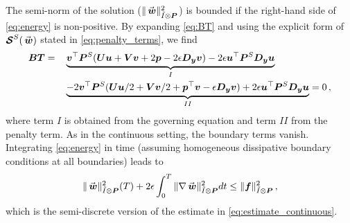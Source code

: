 The semi-norm of the solution ($\|\wn\|^2_{\It\otimes \Pn}$)  is bounded if the right-hand side of \eqref{eq:energy} is non-positive. By expanding \eqref{eq:BT} and using the explicit form of $\satn^S(\wn)$ stated in \eqref{eq:penalty_terms}, we find
\begin{equation*}
\begin{aligned}
 \bm{BT} & = && 
 \underbrace{
 \bm{v}^\top \bm{P}^S(\bm{U}\bm{u} + \bm{V} \bm{v} + 2\bm{p} - 2 \epsilon  \bm{D_y} \bm{v} ) -2 \epsilon\bm{u}^\top \bm{P}^S\bm{D_y}\bm{u}}_I
  \\
  &&&
  \underbrace{
  - 2\bm{v}^\top \bm{P}^S(\bm{U} \bm{u}/2 + \bm{V} \bm{v}/2 + \bm{p}^\top \bm{v} - \epsilon \bm{D_y} \bm{v}) 
  + 2\epsilon \bm{u}^\top \bm{P}^S \bm{D_y} \bm{u}}_{II}
  = 0
  \, ,
\end{aligned}
\end{equation*}
where term $I$ is obtained from the governing equation and term $II$ from the penalty term.
As in the continuous setting, the boundary terms vanish.
Integrating \eqref{eq:energy} in time (assuming homogeneous dissipative boundary conditions at all boundaries) leads to
\begin{equation*}
  \|\wn\|^2_{\It\otimes \Pn} (T)
  + 2\epsilon \int_0^T\|\nabla \wn\|^2_{\It\otimes \Pn} dt \le \|\fn\|^2_{\It\otimes \Pn}
  \, ,
\end{equation*}
which is the semi-discrete version of the estimate in \eqref{eq:estimate_continuous}.
